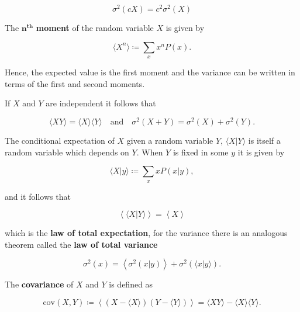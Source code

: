 \begin{equation*}
  \sigma^2(cX) = c^2\sigma^2(X)
\end{equation*}

The $\mathbf{n^{\textbf{th}}}$ \textbf{moment} of the random variable $X$ is given by

\begin{equation*}
  \langle X^n\rangle \coloneqq \sum_xx^nP(x).
\end{equation*}

Hence, the expected value is the first moment and the variance can be written in terms of the first and second moments.

If $X$ and $Y$ are independent it follows that

\begin{equation}
  \label {eq:con-mom_ind}
  \langle XY\rangle = \langle X\rangle\langle Y\rangle \quad\text{and}\quad \sigma^2(X+Y) = \sigma^2(X)+\sigma^2(Y).
\end{equation}

The conditional expectation of $X$ given a random variable $Y$, $\langle X|Y\rangle$ is itself a random variable which depends on $Y$. When $Y$ is fixed in some $y$ it is given by

\begin{equation*}
  \langle X|y\rangle \coloneqq \sum_xxP(x|y),
\end{equation*}

and it follows that

\begin{equation*}
  \left\langle\langle X|Y\rangle\right\rangle = \left\langle X\right\rangle
\end{equation*}

which is the \textbf{law of total expectation}, for the variance there is an analogous theorem called the \textbf{law of total variance}

\begin{equation*}
  \label{eq:con-total_var}
  \sigma^2(x) = \left\langle\sigma^2(x|y)\right\rangle + \sigma^2\left(\langle x|y\rangle\right).
\end{equation*}

The \textbf{covariance} of $X$ and $Y$ is defined as

\begin{equation*}
  \text{cov}(X,Y) \coloneqq \left\langle\left(X-\langle X\rangle\right)\left(Y-\langle Y\rangle\right)\right\rangle = \langle XY\rangle - \langle X\rangle\langle Y\rangle.
\end{equation*}

